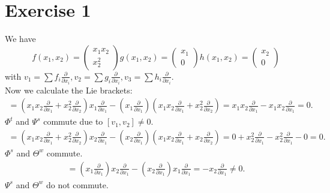 \documentclass{article}
\theoremstyle{named}
\begin{document}
\section*{Exercise 1}
We have
\[
	f(x_1,x_2) = \begin{pmatrix}x_1x_2 \\ x_2^2\end{pmatrix}
	g(x_1,x_2) = \begin{pmatrix}x_1 \\ 0\end{pmatrix}
	h(x_1,x_2) = \begin{pmatrix}x_2 \\ 0\end{pmatrix}
\]
with $v_1 = \sum f_i \frac{\partial}{\partial x_i}, v_2 = \sum g_i \frac{\partial}{\partial x_i}, v_3 = \sum h_i \frac{\partial}{\partial x_i}$.\\

Now we calculate the Lie brackets:
\begin{align*}
	[v_1,v_2] = (x_1x_2 \frac{\partial}{\partial x_1} + x_2^2\frac{\partial}{\partial x_2}) x_1\frac{\partial}{\partial x_1} - (x_1\frac{\partial}{\partial x_1})(x_1x_2\frac{\partial}{\partial x_1} + x_2^2\frac{\partial}{\partial x_2}) = x_1x_2\frac{\partial}{\partial x_1} - x_1x_2\frac{\partial}{\partial x_1} = 0.
\end{align*}
$\Phi^t$ and $\Psi^s$ commute due to $	[v_1,v_2] \neq 0$.
\begin{align*}
	[v_1,v_3] = (x_1x_2 \frac{\partial}{\partial x_1} + x_2^2\frac{\partial}{\partial x_2})x_2\frac{\partial}{\partial x_1} - (x_2\frac{\partial}{\partial x_1})(x_1x_2\frac{\partial}{\partial x_1} + x_2\frac{\partial}{\partial x_2}) = 0 + x_2^2\frac{\partial}{\partial x_1} - x_2^2 \frac{\partial}{\partial x_1} - 0 = 0.
\end{align*}
$\Phi^s$ and $\Theta^w$ commute.
\begin{align*}
[v_2,v_3] = (x_1 \frac{\partial}{\partial x_1})x_2\frac{\partial}{\partial x_1} - (x_2\frac{\partial}{\partial x_1})x_1\frac{\partial}{\partial x_1} = -x_2 \frac{\partial}{\partial x_1} \neq 0.
\end{align*}
$\Psi^s$ and $\Theta^w$ do not commute.
\end{document}
